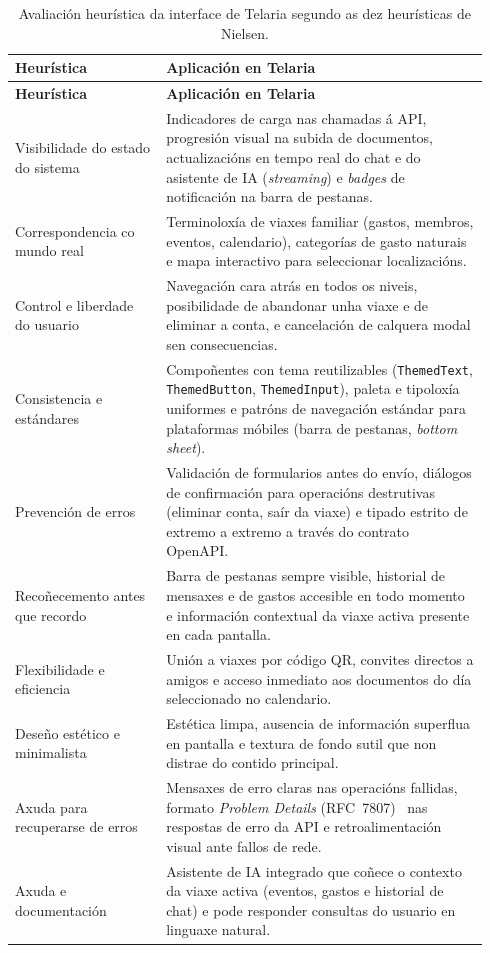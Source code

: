 \begin{longtable}{@{}p{0.30\linewidth}p{0.64\linewidth}@{}}
  \caption{Avaliación heurística da interface de Telaria segundo as dez heurísticas de Nielsen.}
  \label{tab:heuristicas} \\
  \toprule
  \textbf{Heurística} & \textbf{Aplicación en Telaria} \\
  \midrule
  \endfirsthead
  \toprule
  \textbf{Heurística} & \textbf{Aplicación en Telaria} \\
  \midrule
  \endhead
  \bottomrule
  \endlastfoot
  Visibilidade do estado do sistema &
    Indicadores de carga nas chamadas á API, progresión visual na subida de
    documentos, actualizacións en tempo real do chat e do asistente de IA
    (\textit{streaming}) e \textit{badges} de notificación na barra de pestanas. \\
  \addlinespace
  Correspondencia co mundo real &
    Terminoloxía de viaxes familiar (gastos, membros, eventos, calendario),
    categorías de gasto naturais e mapa interactivo para seleccionar localizacións. \\
  \addlinespace
  Control e liberdade do usuario &
    Navegación cara atrás en todos os niveis, posibilidade de abandonar unha viaxe
    e de eliminar a conta, e cancelación de calquera modal sen consecuencias. \\
  \addlinespace
  Consistencia e estándares &
    Compoñentes con tema reutilizables (\texttt{ThemedText}, \texttt{ThemedButton},
    \texttt{ThemedInput}), paleta e tipoloxía uniformes e patróns de navegación
    estándar para plataformas móbiles (barra de pestanas, \textit{bottom sheet}). \\
  \addlinespace
  Prevención de erros &
    Validación de formularios antes do envío, diálogos de confirmación para
    operacións destrutivas (eliminar conta, saír da viaxe) e tipado estrito de
    extremo a extremo a través do contrato OpenAPI. \\
  \addlinespace
  Recoñecemento antes que recordo &
    Barra de pestanas sempre visible, historial de mensaxes e de gastos accesible
    en todo momento e información contextual da viaxe activa presente en cada
    pantalla. \\
  \addlinespace
  Flexibilidade e eficiencia &
    Unión a viaxes por código QR, convites directos a amigos e acceso inmediato
    aos documentos do día seleccionado no calendario. \\
  \addlinespace
  Deseño estético e minimalista &
    Estética limpa, ausencia de información superflua en
    pantalla e textura de fondo sutil que non distrae do contido principal. \\
  \addlinespace
  Axuda para recuperarse de erros &
    Mensaxes de erro claras nas operacións fallidas, formato \textit{Problem
    Details} (RFC~7807)~\cite{rfc7807} nas respostas de erro da API e
    retroalimentación visual ante fallos de rede. \\
  \addlinespace
  Axuda e documentación &
    Asistente de IA integrado que coñece o contexto da viaxe activa (eventos,
    gastos e historial de chat) e pode responder consultas do usuario en
    linguaxe natural. \\
\end{longtable}

